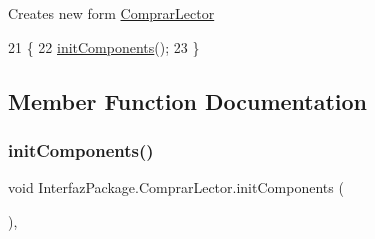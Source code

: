 Creates new form \mbox{\hyperlink{class_interfaz_package_1_1_comprar_lector}{Comprar\+Lector}} 
\begin{DoxyCode}
21                            \{
22         \mbox{\hyperlink{class_interfaz_package_1_1_comprar_lector_a2f43f6b60900e6da4cb02eb426b9e6a8}{initComponents}}();
23     \}
\end{DoxyCode}


\subsection{Member Function Documentation}
\mbox{\label{class_interfaz_package_1_1_comprar_lector_a2f43f6b60900e6da4cb02eb426b9e6a8}} 
\subsubsection{\texorpdfstring{init\+Components()}{initComponents()}}
{\footnotesize\ttfamily void Interfaz\+Package.\+Comprar\+Lector.\+init\+Components (\begin{DoxyParamCaption}{ }\end{DoxyParamCaption})\hspace{0.3cm}{\ttfamily [inline]}, {\ttfamily [private]}}

